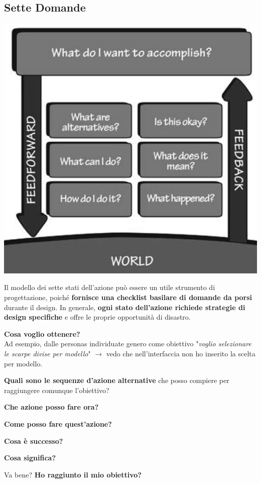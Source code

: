 \documentclass[10pt]{article}
\begin{document}
\subsection{Sette Domande}
\begin{multicols}{2}
\includegraphics[scale=0.345]{setteprincipi.png}

\columnbreak
Il modello dei sette stati dell'azione può essere un utile strumento di progettazione, poiché \textbf{fornisce una checklist basilare di domande da porsi} durante il design. In generale, \textbf{ogni stato dell'azione richiede strategie di design specifiche} e offre le proprie opportunità di disastro.
\begin{list}{-}{Derivano quindi 7 domande, a cui \textbf{dovrebbe poter rispondere chiunque} stia usando quel prodotto.}
\item \textbf{Cosa voglio ottenere?}\\Ad esempio, dalle personas individuate genero come obiettivo "\textit{voglio selezionare le scarpe divise per modello}" $\rightarrow$ vedo che nell'interfaccia non ho inserito la scelta per modello.
\item \textbf{Quali sono le sequenze d'azione alternative} che posso compiere per raggiungere comunque l'obiettivo?
\item \textbf{Che azione posso fare ora?}
\item \textbf{Come posso fare quest'azione?}
\item \textbf{Cosa è successo?}
\item \textbf{Cosa significa?}
\item Va bene? \textbf{Ho raggiunto il mio obiettivo?}
\end{list}
\end{multicols}
\pagebreak
\end{document}
